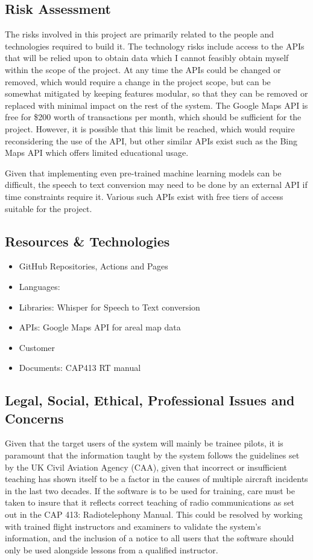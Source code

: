 \subsection{Risk Assessment}
The risks involved in this project are primarily related to the people and technologies required to build it.
The technology risks include access to the APIs that will be relied upon to obtain data which I cannot feasibly obtain myself within the scope of the project.
At any time the APIs could be changed or removed, which would require a change in the project scope, but can be somewhat mitigated by keeping features modular, so that they can be removed or replaced with minimal impact on the rest of the system.
The Google Maps API is free for \$200 worth of transactions per month, which should be sufficient for the project. However, it is possible that this limit be reached, which would require reconsidering the use of the API, but other similar APIs exist such as the Bing Maps API which offers limited educational usage.

Given that implementing even pre-trained machine learning models can be difficult, the speech to text conversion may need to be done by an external API if time constraints require it. Various such APIs exist with free tiers of access suitable for the project.

\subsection{Resources \& Technologies}
\begin{itemize}
    \item GitHub Repositories, Actions and Pages
    \item Languages:
    \item Libraries: Whisper for Speech to Text conversion
    \item APIs: Google Maps API for areal map data
    \item Customer
    \item Documents: CAP413 RT manual
\end{itemize}

\subsection{Legal, Social, Ethical, Professional Issues and Concerns}
Given that the target users of the system will mainly be trainee pilots, it is paramount that the information taught by the system follows the guidelines set by the UK Civil Aviation Agency (CAA), given that incorrect or insufficient teaching has shown itself to be a factor in the causes of multiple aircraft incidents in the last two decades. If the software is to be used for training, care must be taken to insure that it reflects correct teaching of radio communications as set out in the CAP 413: Radiotelephony Manual\cite{CAP413}. This could be resolved by working with trained flight instructors and examiners to validate the system's information, and the inclusion of a notice to all users that the software should only be used alongside lessons from a qualified instructor.